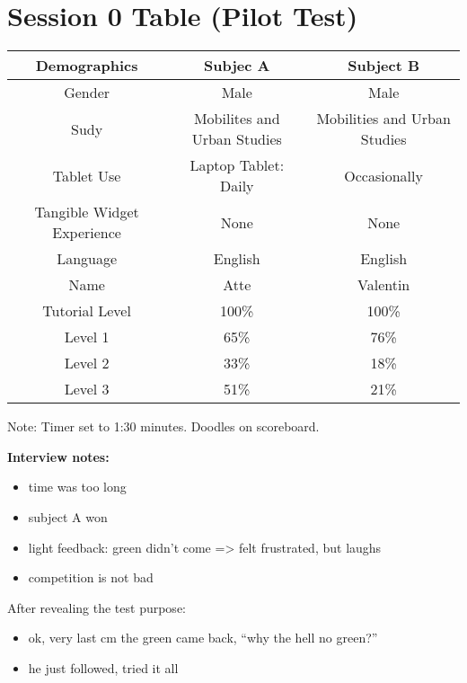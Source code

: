\section*{Session 0 Table (Pilot Test)}
\begin{tabular}{|c|c|c|}
\hline 
\textbf{Demographics} & Subjec A & Subject B \\ 
\hline 
Gender & Male  & Male \\ 
\hline 
Sudy & Mobilites and Urban Studies & Mobilities and Urban Studies \\ 
\hline 
Tablet Use & Laptop Tablet: Daily & Occasionally \\ 
\hline 
Tangible Widget Experience & None & None \\ 
\hline 
Language & English & English \\ 
\hline 
Name & Atte & Valentin \\ 
\hline \hline
Tutorial Level & 100\% & 100\% \\ 
\hline 
Level 1 & 65\% & 76\% \\ 
\hline 
Level 2 & 33\% & 18\% \\ 
\hline 
Level 3 & 51\% & 21\% \\ 
\hline 
\end{tabular} 

Note: Timer set to 1:30 minutes. Doodles on scoreboard.

\textbf{Interview notes:}
\begin{itemize}
\item time was too long
\item subject A won 
\item light feedback: green didn’t come => felt frustrated, but laughs
\item competition is not bad
\end{itemize}

After revealing the test purpose: 
\begin{itemize}
\item ok, very last cm the green came back, “why the hell no green?”
\item he just followed, tried it all
\end{itemize}
